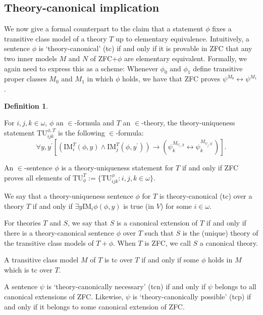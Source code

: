\documentclass[a4paper,12pt]{amsart}
\theoremstyle{definition}
\newtheorem{defini}[fact]{Definition}
\begin{document}
\subsection{Theory-canonical implication}

We now give a formal counterpart to the claim that a statement $\phi$ fixes a transitive class model of a theory $T$ up to elementary equivalence. 
Intuitively, a sentence $\phi$ is `theory-canonical' (tc) if and only if it is provable in ZFC that any two inner models $M$ and $N$ of ZFC+$\phi$ are elementary equivalent.
Formally, we again need to express this as a scheme: Whenever $\phi_{0}$ and $\phi_{1}$ define transitive proper classes $M_{0}$ and $M_{1}$ in which $\phi$ holds, 
we have that ZFC proves $\psi^{M_0}\leftrightarrow\psi^{M_1}$.

\begin{defini}{\label{theory canonical}}

For $i,j,k\in\omega$, $\phi$ an $\in$-formula %
and $T$ an $\in$-theory, the theory-uniqueness statement TU$^{\phi,%
T}_{ijk}$ is the following $\in$-formula:
$$\forall{y,y^{\prime}}[(\text{IM}_{i}^{T}(\phi%
,y)\wedge\text{IM}_{j}^{T}(\phi%
,y^{\prime}))\rightarrow(\psi_{k}^{M_{\psi_{i},y}}\leftrightarrow\psi_{k}^{M_{\psi_{j},y^{\prime}}})].$$

An $\in$-sentence $\phi$ %
is a theory-uniqueness statement for $T$ if and only if ZFC proves all elements of $\text{TU}_{\phi}^{T}:=\{\text{TU}_{ijk}^{\phi%
}:i,j,k\in\omega\}$.

We say that a theory-uniqueness sentence $\phi$ for $T$ %
is theory-canonical (tc) over a theory $T$ if and only if $\exists{y}\text{IM}_{i}\phi(\phi%
,y)$ is true (in $V$) for some $i\in\omega$. 

For theories $T$ and $S$, we say that $S$ is a canonical extension of $T$ if and only if there is a theory-canonical sentence $\phi$ over $T$ such that $S$ is the (unique) theory of the transitive class models of $T+\phi$. When $T$ is ZFC, we call $S$ a canonical theory. 

 A transitive class model $M$ of $T$ is tc over $T$ if and only if some $\phi$ holds in $M$ which is tc over $T$.
 
 A sentence $\psi$ is `theory-canonically necessary' (tcn) if and only if $\psi$ %
 belongs to all canonical extensions of ZFC. 
 Likewise, $\psi$ is `theory-canonically possible' (tcp) if and only if it belongs to some canonical extension of ZFC. 
\end{defini}
\end{document}
